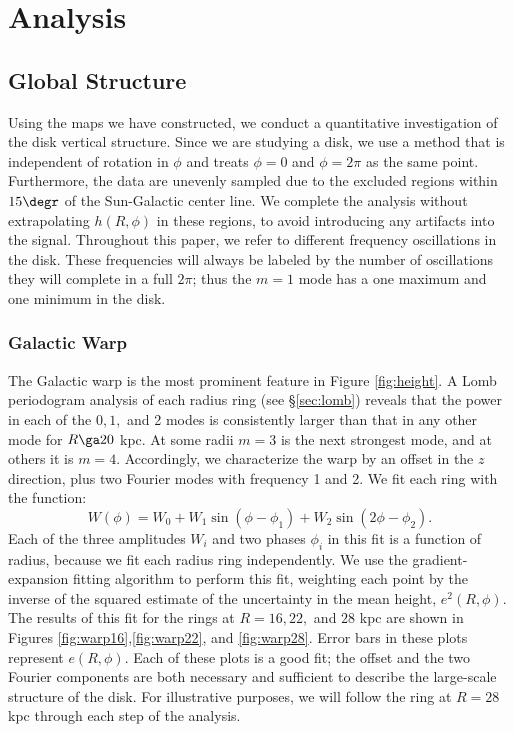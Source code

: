 \documentclass[apj]{emulateapj}
\begin{document}
\section{Analysis}

\subsection{Global Structure}

Using the maps we have constructed, we conduct a quantitative investigation of the disk vertical structure. Since we are studying a disk, we  use a method that is  independent of rotation in $\phi$ and treats  $\phi =0$ and $\phi = 2\pi$ as the same point. Furthermore, the data are unevenly sampled due to the excluded regions within $15\degr$ of the Sun-Galactic center line.  We complete the analysis without extrapolating $h(R,\phi)$ in these regions, to avoid introducing any artifacts into the signal. Throughout this paper, we refer to different frequency oscillations in the disk. These frequencies will always be labeled by the number of oscillations they will complete in a full $2\pi$; thus the $m=1$ mode has a one maximum and one minimum in the disk.

\subsubsection{Galactic Warp}\label{sec:warp}

The Galactic warp is the most prominent feature in Figure \ref{fig:height}.
A Lomb periodogram analysis of each radius ring (see \S \ref{sec:lomb}) reveals that the power in each of the $0,1,$ and 2 modes is consistently larger than that in any other mode for $R\ga 20$ kpc. At some radii $m=3$ is the next strongest mode, and at others it is $m=4$. 
Accordingly, we characterize the warp by an offset in the $z$ direction, plus two Fourier modes with frequency 1 and 2. We  fit each ring with the function:
\begin{equation}\label{eqn:fit}
W(\phi)=W_0 + W_1\sin(\phi -\phi_1)+W_2\sin(2\phi-\phi_2).
\end{equation}
Each of the three amplitudes $W_i$ and two phases $\phi_i$   in this fit is a function of radius, because we fit each radius ring independently.
We use the gradient-expansion  fitting algorithm  to perform this fit, weighting each point by the inverse of the squared estimate of the uncertainty in the mean height, $e^2(R,\phi)$.  The results of this fit for the rings at $R=16,22,$ and $28$ kpc are shown in Figures \ref{fig:warp16},\ref{fig:warp22}, and \ref{fig:warp28}. Error bars in these plots represent $e(R,\phi)$.  Each of these plots is a good fit; the offset and the two Fourier components are both necessary and sufficient to describe the large-scale structure of the disk. For illustrative purposes,  we will follow the ring at $R=28$ kpc through each step of the analysis.
\end{document}
